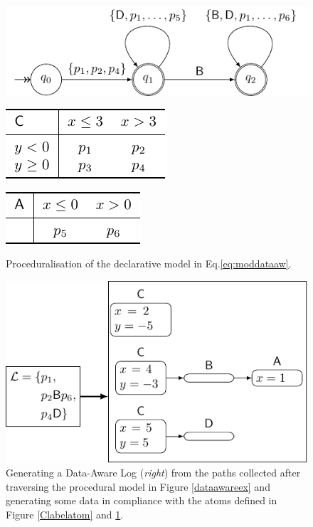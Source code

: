 \documentclass[acmengage]{acmart}
\begin{document}
\begin{figure}[!b]
\centering
\begin{minipage}{\linewidth}
\centering
\includegraphics[scale=.7]{fig/dataaware}
\label{dataawareex}
\end{minipage}

\begin{minipage}{.45\linewidth}\centering
\includegraphics[scale=.8]{fig/tab1b}
\label{Clabelatom}
\end{minipage}\quad \begin{minipage}{.45\linewidth}
\centering
\includegraphics[scale=.8]{fig/tab1c}
\quad\\ \medskip\medskip
{}\label{Alabelatom}
\end{minipage}
\caption{Proceduralisation of the declarative model in Eq.\ref{eq:moddataaw}.}
\end{figure}
\begin{figure}[!t]
\centering
\includegraphics[scale=.6]{fig/loggenerator}
\caption{Generating a Data-Aware Log (\textit{right}) from the paths collected after traversing the procedural model in Figure \ref{dataawareex} and generating some data in compliance with the atoms defined in Figure \ref{Clabelatom} and \ref{Alabelatom}.}\label{loggenex}
\end{figure}
\end{document}
